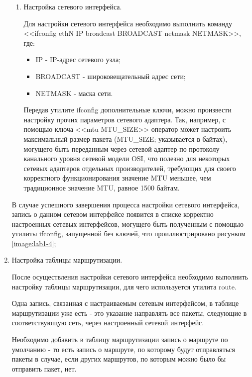 \begin{enumerate}
\begin{enumerate}
			\item Настройка сетевого интерфейса.

			Для настройки сетевого интерфейса необходимо выполнить команду <<ifconfig ethN IP broadcast BROADCAST netmask NETMASK>>, где:
			
			\begin{itemize}
			
				\item IP - IP-адрес сетевого узла;
				\item BROADCAST - широковещательный адрес сети;
				\item NETMASK - маска сети.

			\end{itemize}

			Передав утилите ifconfig дополнительные ключи, можно произвести настройку прочих параметров
			сетевого адаптера. Так, например, с помощью ключа <<mtu MTU\_SIZE>> оператор может настроить
			максимальный размер пакета (MTU\_SIZE; указывается в байтах),
			могущего быть переданным через сетевой адаптер по протоколу канального уровня сетевой модели OSI,
			что полезно для некоторых сетевых адаптеров отдельных производителей, требующих для своего корректного функционирования
			значение MTU меньшее, чем традиционное значение MTU, равное 1500 байтам.

		\end{enumerate}

		В случае успешного завершения процесса настройки сетевого интерфейса, запись о данном сетевом интерфейсе появится
		в списке корректно настроенных сетевых интерфейсов, могущего быть полученным с помощью утилиты ifconfig, запущенной без ключей,
		что проиллюстрировано рисунком \ref{image:lab1-4};


		\item Настройка таблицы маршрутизации.

		После осуществления настройки сетевого интерфейса необходимо выполнить настройку таблицы маршрутизации, для чего используется утилита route.

		Одна запись, связанная с настраиваемым сетевым интерфейсом, в таблице маршрутизации уже есть -
		это указание направлять все пакеты, следующие в соответствующую сеть, через настроенный сетевой интерфейс.

		Необходимо добавить в таблицу маршрутизации запись о маршруте по умолчанию -
		то есть запись о маршруте, по которому будут отправляться пакеты в случае, если других маршрутов,
		по которым можно было бы отправить пакет, нет.
		

\end{enumerate}
